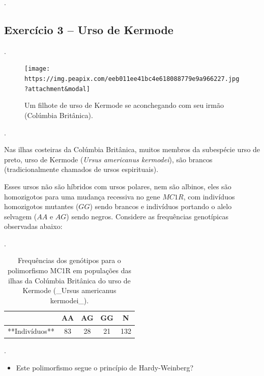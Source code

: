 \documentclass[
]{book}
\providecommand{\tightlist}{%
  \setlength{\itemsep}{0pt}\setlength{\parskip}{0pt}}
\begin{document}
.\linebreak

\hypertarget{exercuxedcio-3-urso-de-kermode}{%
\subsection{Exercício 3 -- Urso de Kermode}\label{exercuxedcio-3-urso-de-kermode}}

.\linebreak

\begin{figure}

{\centering \texttt{[image: https://img.peapix.com/eeb011ee41bc4e618088779e9a966227.jpg?attachment\&modal]} 

}

\caption{Um filhote de urso de Kermode se aconchegando com seu irmão (Colúmbia Britânica).}\label{fig:kermode}
\end{figure}

.\linebreak

Nas ilhas costeiras da Colúmbia Britânica, muitos membros da subespécie urso de preto, urso de Kermode (\emph{Ursus americanus kermodei}), são brancos (tradicionalmente chamados de ursos espirituais).

Esses ursos não são híbridos com ursos polares, nem são albinos, eles são homozigotos para uma mudança recessiva no gene \(MC1R\), com indivíduos homozigotos mutantes (\(GG\)) sendo brancos e indivíduos portando o alelo selvagem (\(AA\) e \(AG\)) sendo negros. Considere as frequências genotípicas observadas abaixo:

.\linebreak

\begin{table}

\caption{\label{tab:tableB09}Frequências dos genótipos para o polimorfismo MC1R em populações das ilhas da Colúmbia Britânica do urso de Kermode (_Ursus americanus kermodei_).}
\centering
\begin{tabular}[t]{lcccc}
\toprule
  & AA & AG & GG & N\\
\midrule
**Indivíduos** & 83 & 28 & 21 & 132\\
\bottomrule
\end{tabular}
\end{table}

.\linebreak

\begin{itemize}
\tightlist
\item
  Este polimorfismo segue o princípio de Hardy-Weinberg?
\end{itemize}
\end{document}
